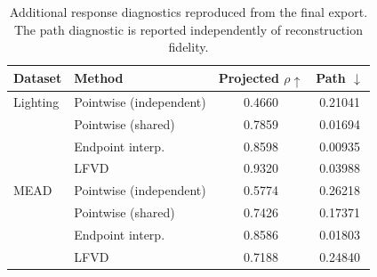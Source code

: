 \begin{table}[t]
\centering
\caption{Additional response diagnostics reproduced from the final export.
The path diagnostic is reported independently of reconstruction fidelity.}
\label{tab:response_diagnostics}
\scriptsize\setlength{\tabcolsep}{3pt}
\begin{tabular*}{\linewidth}{@{\extracolsep{\fill}}llcc@{}}
\toprule
Dataset & Method & Projected $\rho\uparrow$ & Path $\downarrow$\\
\midrule
Lighting & Pointwise (independent) & 0.4660 & 0.21041 \\
 & Pointwise (shared) & 0.7859 & 0.01694 \\
 & Endpoint interp. & 0.8598 & 0.00935 \\
 & LFVD & 0.9320 & 0.03988 \\
\midrule
MEAD & Pointwise (independent) & 0.5774 & 0.26218 \\
 & Pointwise (shared) & 0.7426 & 0.17371 \\
 & Endpoint interp. & 0.8586 & 0.01803 \\
 & LFVD & 0.7188 & 0.24840 \\
\bottomrule
\end{tabular*}
\end{table}
